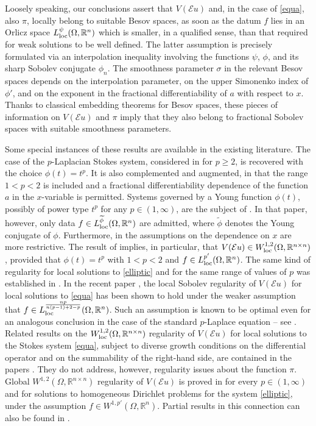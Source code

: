 \documentclass[leqno,11pt]{amsart}%
\numberwithin{equation}{section}
\def\Rn{{\mathbb R}^{n}}
\def\E{\mathcal{E}}
\theoremstyle{definition}
\numberwithin{equation}{section}
\begin{document}
 Loosely speaking, our conclusions assert that   $V(\E u)$ and, in the case of \eqref{equa}, also $\pi$, locally belong to  suitable Besov spaces, as soon as the datum $f$ lies in an Orlicz space $L^\psi _{\rm loc}(\Omega, \Rn)$ which is smaller, in a qualified sense, than that required for weak solutions to be well defined. The latter assumption is precisely formulated via an interpolation inequality involving the functions $\psi$, $\phi$, and its sharp Sobolev conjugate $\phi_n$. The smoothness parameter $\sigma$ in the relevant Besov spaces   depends on the interpolation parameter, on the upper Simonenko index of $\phi'$, and on the exponent in the fractional differentiability of $a$ with respect to $x$. Thanks to classical embedding theorems for Besov spaces, these pieces of information on $V(\E u)$ and $\pi$ imply that they also belong to fractional Sobolev spaces with suitable smoothness parameters.

{Some special instances of these results are available in the existing literature.}
 The case of the $p$-Laplacian Stokes system,  considered in  \cite{GPS2} for $p\geq 2$, is recovered with the choice $\phi(t)=t^p$. It is also complemented and augmented, in that  the range $1<p<2$ is included and a fractional differentiability dependence of the function $a$ in the $x$-variable is permitted. Systems governed by a Young function $\phi(t)$, possibly of power type $t^p$ for any $p\in (1,\infty)$, are the subject of \cite{GPS}. In that paper, however, only data $f\in L^{\widetilde \phi}_{\rm loc}(\Omega, \Rn)$ are admitted, where $\widetilde \phi$ denotes the Young conjugate of $\phi$. Furthermore, in \cite{GPS} 
the assumptions on the dependence on $x$ are more restrictive.  
 The result  of \cite{GPS} implies, in particular, that $V(\E u)\in W^{1,2}_{\rm loc}(\Omega, \mathbb R^{n\times n})$, provided that $\phi(t)=t^p$ with $1<p<2$ and $f\in L^{p'}_{\rm loc}(\Omega, \Rn)$. The same kind of regularity for local solutions to \eqref{elliptic} and for the same range of values of $p$ was established in \cite{Ser}.  In the recent paper \cite{Cavagnoli}, the local Sobolev regularity of $V(\E u)$ for local solutions to \eqref{equa}  has been shown to hold under the weaker assumption that  $f\in L^{\frac{np}{n(p-1)+2-p}}_{\rm loc}(\Omega, \Rn)$. Such an assumption is known to be optimal  even for an analogous
 conclusion in the case of the standard $p$-Laplace equation -- see \cites{ClopGentileAPdN}.
 Related results on the $W^{1,2}_{\rm loc}(\Omega, \mathbb R^{n\times n})$ regularity of $V(\E u)$ for local solutions to the Stokes system \eqref{equa}, subject to diverse growth conditions on the differential operator and on the summability of the right-hand side,  are contained in the papers \cites{Breit, BrFu, DiKa, FuSe, Na}. They do not address, however,  regularity issues about the function $\pi$.
Global $W^{1,2}(\Omega, \mathbb R^{n\times n})$ regularity of $V(\E u)$ is proved in \cite{BeDi} for every $p\in (1,\infty)$ and  for solutions to homogeneous Dirichlet problems for the system \eqref{elliptic}, under the assumption  $f\in W^{1,p'}(\Omega, \Rn)$. Partial results in this connection can also be found in \cites{BKR, BeRu1,  SerSh}.
  
\end{document}
